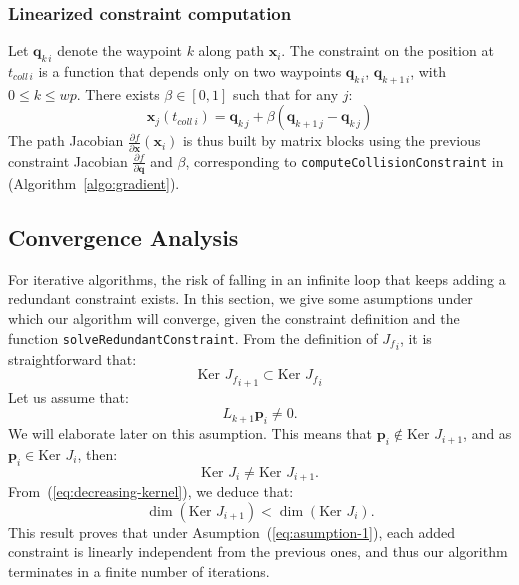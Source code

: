 \documentclass{tADR2e}
\newcommand\p{\mathbf{p}}
\newcommand\pii{\mathbf{p_{i,i+1}}}
\newcommand\conf{\mathbf{q}}
\newcommand\xx{\mathbf{x}} %
\newcommand\tcolli{t_{coll\ i}}
\newcommand\Jf{{J_f}}
\newcommand\kernel{\mbox{Ker }}
\begin{document}

\vspace{0.2cm}

\subsubsection{Linearized constraint computation} \label{sec:lin_constr_compt}

Let $\conf_{k\,i}$ denote the waypoint $k$ along path $\xx_i$.
The constraint on the position at $t_{coll\,i}$ is a function that depends only
on two waypoints $\conf_{k\,i}$, $\conf_{k+1\,i}$, with $0\leq k\leq wp$.
There exists $\beta\in[0,1]$ such that for any $j$:
$$
\xx_j (\tcolli) = \conf_{k\,j} + \beta (\conf_{k+1\,j} - \conf_{k\,j})
$$
The path Jacobian $\frac{\partial f}{\partial \xx}(\xx_i)$ is thus built by matrix 
blocks using the previous constraint Jacobian $\frac{\partial f}{\partial \conf}$ 
and $\beta$, corresponding to \texttt{computeCollisionConstraint} in 
(Algorithm~\ref{algo:gradient}).


\subsection{Convergence Analysis}
For iterative algorithms, the risk of falling in an infinite loop 
that keeps adding a redundant constraint exists.
In this section, we give some asumptions under which our 
algorithm will converge, given the constraint definition and the 
function \texttt{solveRedundantConstraint}.
From the definition of $\Jf_{i}$, it is straightforward that:
\begin{equation}\label{eq:decreasing-kernel}
\kernel \Jf_{i+1} \subset \kernel \Jf_{i}
\end{equation}
Let us assume that:
\begin{equation}\label{eq:asumption-1}
L_{k+1}\p_i \not= 0.
\end{equation}
We will elaborate later on this asumption. This means that $\p_{i}\notin\kernel J_{i+1}$, and as $\p_{i}\in\kernel J_{i}$, then:
$$
\kernel J_i \not= \kernel J_{i+1}.
$$
From~(\ref{eq:decreasing-kernel}), we deduce that:
$$
\dim (\kernel J_{i+1}) < \dim (\kernel J_i).
$$
This result proves that under Asumption~(\ref{eq:asumption-1}), each added constraint 
is linearly independent from the 
previous ones, and thus our algorithm terminates in a finite number of iterations.
\end{document}
